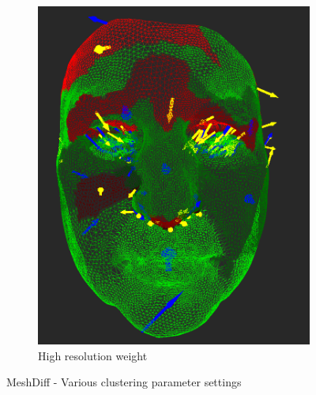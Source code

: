 \begin{figure}[h]
\begin{subfigure}{0.3\textwidth}
	\includegraphics[width=\textwidth]{./img/meshdiff-high_resolution.PNG}
	\caption{High resolution weight}
	\label{fig:meshdiff_high_resolution}
	\end{subfigure}
\caption{MeshDiff - Various clustering parameter settings}
\end{figure}